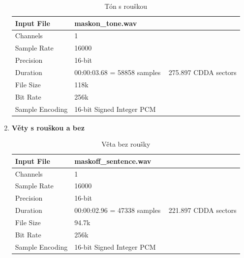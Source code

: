 \documentclass[a4paper]{article}
\begin{document}
\begin{enumerate}
            \begin{table}[!ht]
                \renewcommand{\arraystretch}{1.5}
                \centering
                \begin{tabular}{|l|l|}
                \hline
                    Input File & maskon\_tone.wav \\ \hline
                    Channels & 1\\ \hline
                    Sample Rate & 16000\\ \hline
                    Precision & 16-bit\\ \hline
                    Duration & 00:00:03.68 = 58858 samples ~ 275.897 CDDA sectors\\ \hline
                    File Size & 118k\\ \hline
                    Bit Rate & 256k\\ \hline
                    Sample Encoding & 16-bit Signed Integer PCM\\
                \hline
                \end{tabular}
                \caption{Tón s rouškou}
                \label{tab:maask_on_tone}
            \end{table}
        \item \textbf{Věty s rouškou a bez}
            \begin{table}[!ht]
                \renewcommand{\arraystretch}{1.5}
                \centering
                \begin{tabular}{|l|l|}
                \hline
                    Input File & maskoff\_sentence.wav \\ \hline
                    Channels & 1\\ \hline
                    Sample Rate & 16000\\ \hline
                    Precision & 16-bit\\ \hline
                    Duration & 00:00:02.96 = 47338 samples ~ 221.897 CDDA sectors\\ \hline
                    File Size & 94.7k\\ \hline
                    Bit Rate & 256k\\ \hline
                    Sample Encoding & 16-bit Signed Integer PCM\\
                \hline
                \end{tabular}
                \caption{Věta bez roušky}
                \label{tab:mask_off_sentence}
            \end{table}

\end{enumerate}
\end{document}
